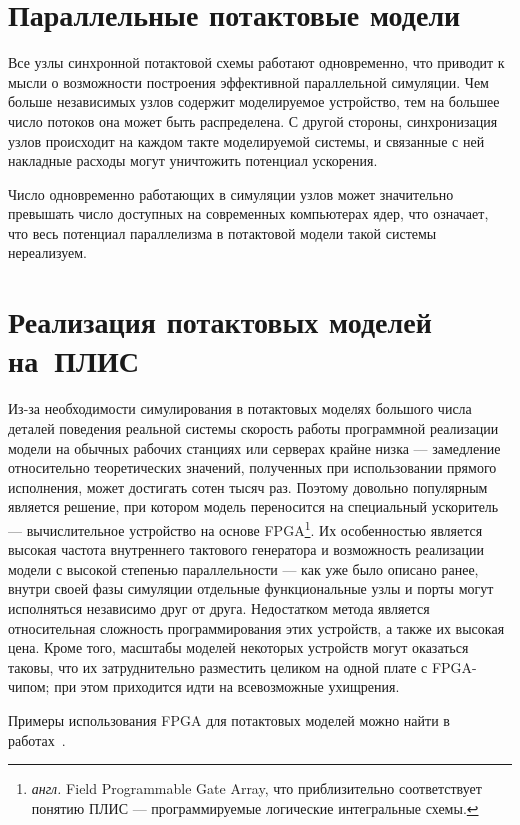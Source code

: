 \section{Параллельные потактовые модели}

Все узлы синхронной потактовой схемы работают одновременно, что приводит к мысли о возможности построения эффективной параллельной симуляции. Чем больше независимых узлов содержит моделируемое устройство, тем на большее число потоков она может быть распределена. С другой стороны, синхронизация узлов происходит на каждом такте моделируемой системы, и связанные с ней накладные расходы могут уничтожить потенциал ускорения.

Число одновременно работающих в симуляции узлов может значительно превышать число доступных на современных компьютерах ядер, что означает, что весь потенциал параллелизма в потактовой модели такой системы нереализуем.


\section{Реализация потактовых моделей на~ПЛИС}

Из-за необходимости симулирования в потактовых моделях большого числа деталей поведения реальной системы скорость работы программной реализации модели на обычных рабочих станциях или серверах крайне низка — замедление относительно теоретических значений, полученных при использовании прямого исполнения, может достигать сотен тысяч раз. Поэтому довольно популярным является решение, при котором модель переносится на специальный ускоритель — вычислительное устройство на основе FPGA\footnote{\textit{англ.} Field Programmable Gate Array, что приблизительно соответствует понятию ПЛИС — программируемые логические интегральные схемы.}. Их особенностью является высокая частота внутреннего тактового генератора и возможность реализации модели с высокой степенью параллельности — как уже было описано ранее, внутри своей фазы симуляции отдельные функциональные узлы и порты могут исполняться независимо друг от друга. Недостатком метода является относительная сложность программирования этих устройств, а также их высокая цена. Кроме того, масштабы моделей некоторых устройств могут оказаться таковы, что их затруднительно разместить целиком на одной плате с FPGA-чипом; при этом приходится идти на всевозможные ухищрения.

Примеры использования FPGA для потактовых моделей можно найти в работах~\cite{a-ports, hasim}.

